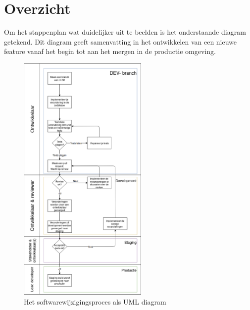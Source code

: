 \clearpage
\section{Overzicht}
Om het stappenplan wat duidelijker uit te beelden is het onderstaande diagram getekend. Dit diagram geeft samenvatting in het ontwikkelen van een nieuwe feature vanaf het begin tot aan het mergen in de productie omgeving.
\begin{figure}[h]
	\centering\includegraphics[width=0.56\textwidth]{images/UMLSoftwareChange.png}
	\caption{Het softwarewijzigingsproces als UML diagram}
\end{figure}